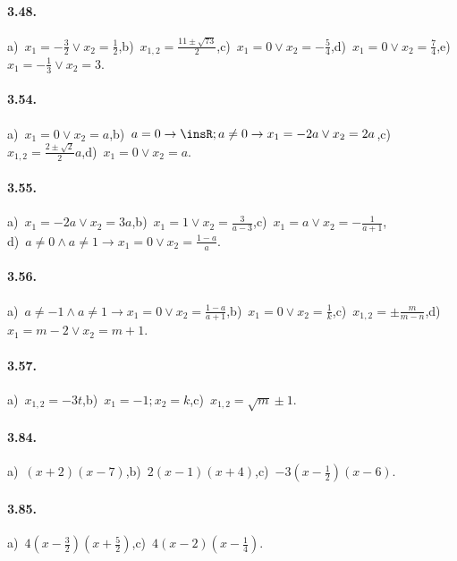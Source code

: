 \paragraph{3.48.} a)~$x_{1} =-\frac{3}{2} \vee x_{2} = \frac{1}{2}$,\quad b)~$x_{1,2} = \frac{11 \pm \sqrt{73}}{2}$,\quad c)~$x_{1} = 0 \vee x_{2} =-\frac{5}{4}$,\quad d)~$x_{1} = 0 \vee x_{2} = \frac{7}{4}$,\quad e)~$x_{1} =-\frac{1}{3} \vee x_{2} = 3$.

\paragraph{3.54.} a)~$x_{1} = 0 \vee x_{2} = a$,\quad b)~$a = 0 \rightarrow \insR; a \neq 0 \rightarrow x_{1}=-2 a \vee x_{2} = 2 a$,\quad c)~$x_{1,2} = \frac{2\pm\sqrt{2}}{2} a$,\quad d)~$x_{1} = 0 \vee x_{2} = a$.

\paragraph{3.55.} a)~$x_{1} =-2 a \vee x_{2} = 3 a$,\quad b)~$x_{1} = 1 \vee x_{2} = \frac{3}{a-3}$,\quad c)~$x_{1} = a \vee x_{2} =-\frac{1}{a + 1}$,\protect\\ \quad d)~$a \neq 0 \wedge a \neq 1 \rightarrow x_{1} = 0 \vee x _{2} = \frac{1-a}{a}$.

\paragraph{3.56.} a)~$a \neq-1 \wedge a \neq 1 \rightarrow x_{1} = 0 \vee x_{2} = \frac{1-a}{a + 1}$,\quad b)~$x_{1} = 0 \vee x_{2} = \frac{1}{k}$,\quad c)~$x_{1,2} = \pm \frac{m}{m-n}$,\quad d)~$x_{1} = m-2 \vee x_{2} = m + 1$.

\paragraph{3.57.} a)~$x_{1,2} =-3t$,\quad b)~$x_{1} =-1;x_{2} = k$,\quad c)~$x_{1,2} = \sqrt{m} \pm 1$.

\paragraph{3.84.} a)~$(x + 2) (x-7)$,\quad b)~$2 (x-1) (x + 4)$,\quad c)~$- 3 \left(x-\frac{1}{2} \right) (x-6)$.

\paragraph{3.85.} a)~$4 \left(x-\frac{3}{2} \right) \left(x + \frac{5}{2} \right)$,\quad c)~$4 (x-2) \left(x-\frac{1}{4} \right)$.

